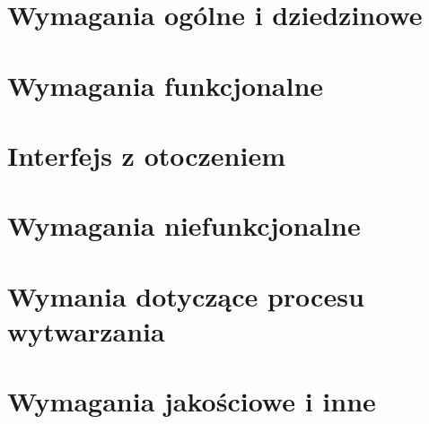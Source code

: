 



\section{Wymagania ogólne i dziedzinowe }
\label{sec:wymagania-ogolne-i-dziedzinowe}

\section{Wymagania funkcjonalne}
\label{sec:}



\section{Interfejs z otoczeniem }
\label{sec:interfejs-z-otoczeniem}

\section{Wymagania niefunkcjonalne}
\label{sec:wymagania-niefunkcjonalne}

\section{Wymania dotyczące procesu wytwarzania}
\label{sec:wymania-dotyczace-procesu-wytwarzania}

\section{Wymagania jakościowe i inne}
\label{sec:wymagania-jakosciowe-i-inne}

